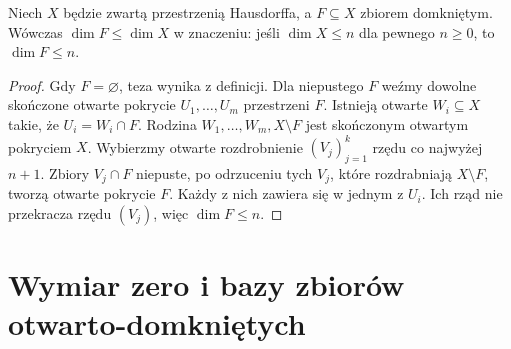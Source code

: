 \begin{twierdzenie}
\label{thm:topog23-closed-monotone}
Niech \(X\) będzie zwartą przestrzenią Hausdorffa,
a \(F\subseteq X\) zbiorem domkniętym.
Wówczas \(\dim F\le\dim X\)
w znaczeniu: jeśli \(\dim X\le n\)
dla pewnego \(n\ge0\), to \(\dim F\le n\).
\end{twierdzenie}
\begin{proof}
Gdy \(F=\varnothing\), teza wynika z definicji.
Dla niepustego \(F\) weźmy dowolne
skończone otwarte pokrycie
\(U_1,\ldots,U_m\) przestrzeni \(F\).
Istnieją otwarte \(W_i\subseteq X\)
takie, że \(U_i=W_i\cap F\).
Rodzina \(W_1,\ldots,W_m,X\setminus F\)
jest skończonym otwartym pokryciem \(X\).
Wybierzmy otwarte rozdrobnienie
\((V_j)_{j=1}^k\) rzędu co najwyżej \(n+1\).
Zbiory \(V_j\cap F\) niepuste,
po odrzuceniu tych \(V_j\),
które rozdrabniają \(X\setminus F\),
tworzą otwarte pokrycie \(F\).
Każdy z nich zawiera się w jednym z \(U_i\).
Ich rząd nie przekracza rzędu \((V_j)\),
więc \(\dim F\le n\).
\end{proof}

\section{Wymiar zero i bazy zbiorów otwarto-domkniętych}
\label{sec:topog23-zero}

